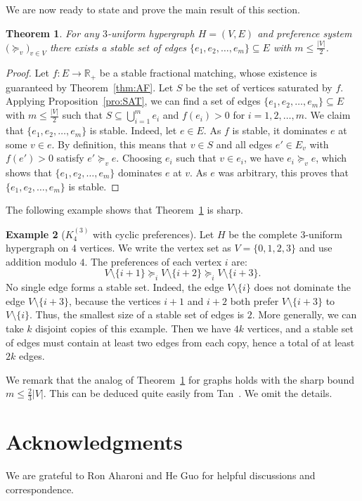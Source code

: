 \documentclass{article}
\newtheorem{theorem}{Theorem}[section]
\theoremstyle{definition}
\newtheorem{example}[theorem]{Example}
\begin{document}
We are now ready to state and prove the main result of this section.
\begin{theorem} \label{thm:GSH}
For any $3$-uniform hypergraph $H = (V, E)$ and preference system $\bigl( \succeq_v\bigr)_{v \in V}$ there exists a stable set of edges $\{e_1, e_2, \ldots , e_m\} \subseteq E$ with $m \le \frac{|V|}{2}$.
\end{theorem}
\begin{proof} Let $f: E \to \mathbb{R}_+$ be a stable fractional matching, whose existence is guaranteed by Theorem~\ref{thm:AF}. Let $S$ be the set of vertices saturated by $f$. Applying Proposition~\ref{pro:SAT}, we can find a set of edges $\{e_1, e_2, \ldots , e_m\} \subseteq E$ with $m \le \frac{|V|}{2}$ such that $S \subseteq \bigcup_{i=1}^m e_i$ and $f(e_i) > 0$ for $i=1,2, \ldots ,m$. We claim that $\{e_1, e_2, \ldots , e_m\}$ is stable. Indeed, let $e \in E$. As $f$ is stable, it dominates $e$ at some $v \in e$. By definition, this means that $v \in S$ and all edges $e' \in E_v$ with $f(e') > 0$ satisfy $e' \succeq_v e$. Choosing $e_i$ such that $v \in e_i$, we have $e_i \succeq_v e$, which shows that $\{e_1, e_2, \ldots , e_m\}$ dominates $e$ at $v$. As $e$ was arbitrary, this proves that $\{e_1, e_2, \ldots , e_m\}$ is stable.
\end{proof}
The following example shows that Theorem~\ref{thm:GSH} is sharp.
\begin{example}[$K^{(3)}_4$ with cyclic preferences]
Let $H$ be the complete $3$-uniform hypergraph on $4$ vertices. We write the vertex set as $V = \{0,1,2,3\}$ and use addition modulo $4$. The preferences of each vertex $i$ are: \[ V \setminus \{i+1\} \succeq_i V \setminus \{i+2\} \succeq_i V \setminus \{i+3\}.\] No single edge forms a stable set. Indeed, the edge $V \setminus \{i\}$ does not dominate the edge $V \setminus \{i+3\}$, because the vertices $i+1$ and $i+2$ both prefer $V \setminus \{i+3\}$ to $V \setminus \{i\}$. Thus, the smallest size of a stable set of edges is $2$. More generally, we can take $k$ disjoint copies of this example. Then we have $4k$ vertices, and a stable set of edges must contain at least two edges from each copy, hence a total of at least $2k$ edges.
\end{example}
We remark that the analog of Theorem~\ref{thm:GSH} for graphs holds with the sharp bound $m \le \frac{2}{3}|V|$. This can be deduced quite easily from Tan~\cite{Tan}. We omit the details.

\section*{Acknowledgments}
We are grateful to Ron Aharoni and He Guo for helpful discussions and correspondence.
\end{document}
